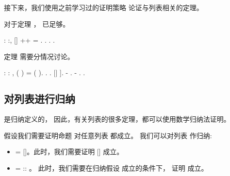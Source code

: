 \documentclass[12pt]{report}
\begin{document}
{{{  接下来，我们使用之前学习过的证明策略
  论证与列表相关的定理。


 对于定理 ， 已足够。\begin{coqdoccode}
\coqdocemptyline
\coqdocnoindent
{}  : \coqdockw{\ensuremath{\forall}} :,\coqdoceol
\coqdocindent{1.00em}
[] ++  = .\coqdoceol
\coqdocnoindent
{}. . .\coqdoceol
\coqdocemptyline
\end{coqdoccode}
定理  需要分情况讨论。\begin{coqdoccode}
\coqdocemptyline
\coqdocnoindent
{}  : \coqdockw{\ensuremath{\forall}}  : ,\coqdoceol
\coqdocindent{1.00em}
 ( ) =  ( ).\coqdoceol
\coqdocnoindent
{}.\coqdoceol
\coqdocindent{1.00em}
 .    [|  ].\coqdoceol
\coqdocindent{1.00em}
- \coqdoceol
\coqdocindent{2.00em}
.\coqdoceol
\coqdocindent{1.00em}
- \coqdoceol
\coqdocindent{2.00em}
.\coqdoceol
\coqdocnoindent
{}.\coqdoceol
\end{coqdoccode}
\subsection{对列表进行归纳}





   是归纳定义的，
  因此，有关列表的很多定理，都可以使用数学归纳法证明。


  假设我们需要证明命题  对任意列表  都成立。
  我们可以对列表  作归纳:

\begin{itemize}
\item  {} = []。此时，我们需要证明  [] 成立。

\item  {} =  :: 。
    此时，我们需要在归纳假设   成立的条件下，
    证明   成立。

\end{itemize}




}}}
\end{document}
